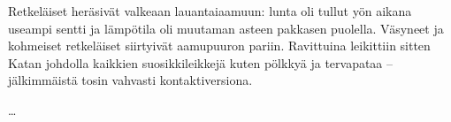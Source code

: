 \begin{multicols}{2}
	Retkeläiset heräsivät valkeaan lauantaiaamuun: lunta oli tullut yön aikana
	useampi sentti ja lämpötila oli muutaman asteen pakkasen puolella. Väsyneet ja
	kohmeiset retkeläiset siirtyivät aamupuuron pariin. Ravittuina leikittiin
	sitten Katan johdolla kaikkien suosikkileikkejä kuten pölkkyä ja tervapataa --
	jälkimmäistä tosin vahvasti kontaktiversiona.

	\ldots

\end{multicols}
